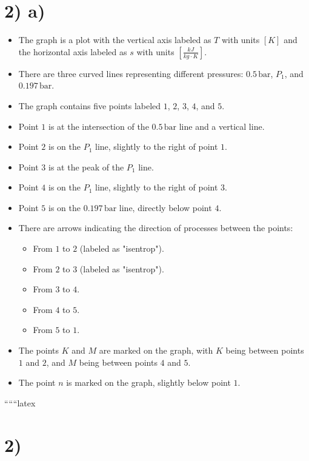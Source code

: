 \section*{2) a)}

\begin{itemize}
    \item The graph is a plot with the vertical axis labeled as \( T \) with units \([K]\) and the horizontal axis labeled as \( s \) with units \(\left[\frac{kJ}{kg \cdot K}\right]\).
    \item There are three curved lines representing different pressures: \(0.5 \, \text{bar}\), \(P_1\), and \(0.197 \, \text{bar}\).
    \item The graph contains five points labeled \(1\), \(2\), \(3\), \(4\), and \(5\).
    \item Point \(1\) is at the intersection of the \(0.5 \, \text{bar}\) line and a vertical line.
    \item Point \(2\) is on the \(P_1\) line, slightly to the right of point \(1\).
    \item Point \(3\) is at the peak of the \(P_1\) line.
    \item Point \(4\) is on the \(P_1\) line, slightly to the right of point \(3\).
    \item Point \(5\) is on the \(0.197 \, \text{bar}\) line, directly below point \(4\).
    \item There are arrows indicating the direction of processes between the points: 
        \begin{itemize}
            \item From \(1\) to \(2\) (labeled as "isentrop").
            \item From \(2\) to \(3\) (labeled as "isentrop").
            \item From \(3\) to \(4\).
            \item From \(4\) to \(5\).
            \item From \(5\) to \(1\).
        \end{itemize}
    \item The points \(K\) and \(M\) are marked on the graph, with \(K\) being between points \(1\) and \(2\), and \(M\) being between points \(4\) and \(5\).
    \item The point \(n\) is marked on the graph, slightly below point \(1\).
\end{itemize}

``````latex


\section*{2)}


